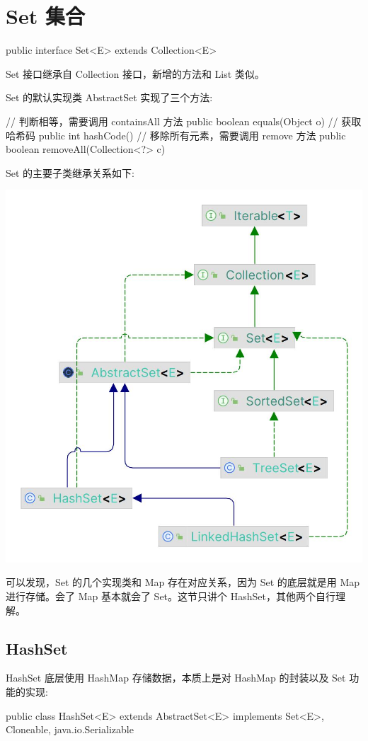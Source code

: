 \section{Set 集合}

\begin{Java}
public interface Set<E> extends Collection<E>
\end{Java}

Set 接口继承自 Collection 接口，新增的方法和 List 类似。

Set 的默认实现类 AbstractSet 实现了三个方法:

\begin{Java}
// 判断相等，需要调用 containsAll 方法
public boolean equals(Object o)
// 获取哈希码
public int hashCode()
// 移除所有元素，需要调用 remove 方法
public boolean removeAll(Collection<?> c)
\end{Java}

Set 的主要子类继承关系如下:

\begin{center}
    \includegraphics[width=0.5\linewidth]{../../../imgs/Set.jpg}
\end{center}

可以发现，Set 的几个实现类和 Map 存在对应关系，因为 Set 的底层就是用 Map 进行存储。会了 Map 基本就会了 Set。这节只讲个 HashSet，其他两个自行理解。

\subsection{HashSet}

HashSet 底层使用 HashMap 存储数据，本质上是对 HashMap 的封装以及 Set 功能的实现:

\begin{Java}
public class HashSet<E> extends AbstractSet<E> implements Set<E>, Cloneable, java.io.Serializable
\end{Java}

